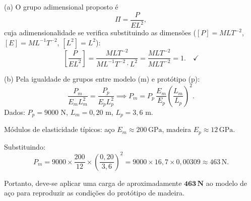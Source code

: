 (a) O grupo adimensional proposto é
\[
\Pi = \frac{P}{E L^2},
\]
cuja adimensionalidade se verifica substituindo as dimensões ($[P]=MLT^{-2}$, $[E]=ML^{-1}T^{-2}$, $[L^2]=L^2$):
\[
\left[\frac{P}{EL^2}\right] = \frac{MLT^{-2}}{ML^{-1}T^{-2}\cdot L^2} = \frac{MLT^{-2}}{MLT^{-2}} = 1.\quad\checkmark
\]

(b) Pela igualdade de grupos entre modelo (m) e protótipo (p):
\[
\frac{P_m}{E_m L_m^2}=\frac{P_p}{E_p L_p^2}
\implies
P_m=P_p\,\frac{E_m}{E_p}\left(\frac{L_m}{L_p}\right)^2.
\]
Dados: $P_p=9000$ N, $L_m=0{,}20$ m, $L_p=3{,}6$ m.

Módulos de elasticidade típicos: a\c{c}o $E_m \approx 200\,\mathrm{GPa}$, madeira $E_p \approx 12\,\mathrm{GPa}$.

Substituindo:
\[
P_m=9000\times\frac{200}{12}\times\left(\frac{0{,}20}{3{,}6}\right)^2
= 9000\times 16{,}7\times 0{,}00309
\approx 463\,\mathrm{N}.
\]

Portanto, deve-se aplicar uma carga de aproximadamente $\mathbf{463\,N}$ ao modelo de a\c{c}o para reproduzir as condi\c{c}\~oes do protótipo de madeira.

